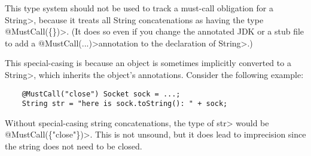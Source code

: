 




This type system should not be used to track a must-call obligation for a \<String>, because it treats all
String concatenations as having the type \<@MustCall(\{\})>.  (It does so
even if you change the annotated JDK or a stub file to add a
\<@MustCall(...)>\@ annotation to the declaration of \<String>.)

This special-casing is because an object is sometimes implicitly converted
to a \<String>, which inherits the object's annotations.
Consider the following example:
\begin{Verbatim}
    @MustCall("close") Socket sock = ...;
    String str = "here is sock.toString(): " + sock;
\end{Verbatim}
\noindent
Without special-casing string concatenations, the type of
\<str> would be \<@MustCall(\{"close"\})>.  This is not unsound, but it
does lead to imprecision since the string does not need to be closed.



